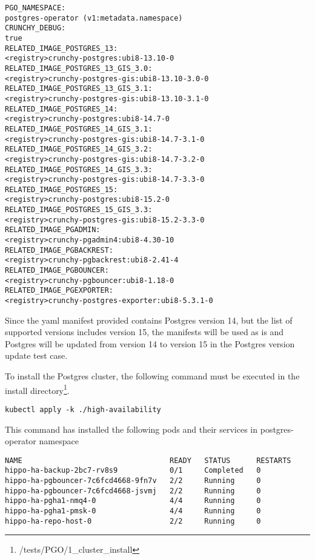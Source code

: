 \begin{verbatim}
PGO_NAMESPACE:                      
postgres-operator (v1:metadata.namespace)                                    
CRUNCHY_DEBUG:                      
true                                  
RELATED_IMAGE_POSTGRES_13:          
<registry>crunchy-postgres:ubi8-13.10-0
RELATED_IMAGE_POSTGRES_13_GIS_3.0:  
<registry>crunchy-postgres-gis:ubi8-13.10-3.0-0                               
RELATED_IMAGE_POSTGRES_13_GIS_3.1:  
<registry>crunchy-postgres-gis:ubi8-13.10-3.1-0                               
RELATED_IMAGE_POSTGRES_14:          
<registry>crunchy-postgres:ubi8-14.7-0 
RELATED_IMAGE_POSTGRES_14_GIS_3.1:  
<registry>crunchy-postgres-gis:ubi8-14.7-3.1-0                                
RELATED_IMAGE_POSTGRES_14_GIS_3.2:  
<registry>crunchy-postgres-gis:ubi8-14.7-3.2-0                                
RELATED_IMAGE_POSTGRES_14_GIS_3.3:  
<registry>crunchy-postgres-gis:ubi8-14.7-3.3-0                                
RELATED_IMAGE_POSTGRES_15:          
<registry>crunchy-postgres:ubi8-15.2-0 
RELATED_IMAGE_POSTGRES_15_GIS_3.3:  
<registry>crunchy-postgres-gis:ubi8-15.2-3.3-0                                
RELATED_IMAGE_PGADMIN:              
<registry>crunchy-pgadmin4:ubi8-4.30-10
RELATED_IMAGE_PGBACKREST:           
<registry>crunchy-pgbackrest:ubi8-2.41-4                                      
RELATED_IMAGE_PGBOUNCER:            
<registry>crunchy-pgbouncer:ubi8-1.18-0
RELATED_IMAGE_PGEXPORTER:           
<registry>crunchy-postgres-exporter:ubi8-5.3.1-0
\end{verbatim}

Since the yaml manifest provided contains Postgres version 14, but the list of supported versions includes version 15, the manifests will be used as is and Postgres will be updated from version 14 to version 15 in the Postgres version update test case.

To install the Postgres cluster, the following command must be executed in the install directory\footnote{/tests/PGO/1\_cluster\_install}.
\begin{verbatim}
kubectl apply -k ./high-availability
\end{verbatim}

This command has installed the following pods and their services in postgres-operator namespace

\begin{verbatim}
NAME                                  READY   STATUS      RESTARTS
hippo-ha-backup-2bc7-rv8s9            0/1     Completed   0
hippo-ha-pgbouncer-7c6fcd4668-9fn7v   2/2     Running     0
hippo-ha-pgbouncer-7c6fcd4668-jsvmj   2/2     Running     0
hippo-ha-pgha1-nmq4-0                 4/4     Running     0
hippo-ha-pgha1-pmsk-0                 4/4     Running     0
hippo-ha-repo-host-0                  2/2     Running     0
\end{verbatim}

